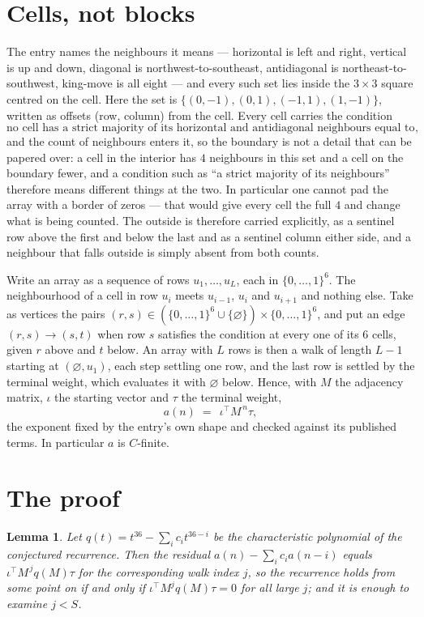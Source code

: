\documentclass[11pt,a4paper]{article}
\theoremstyle{plain}
\newtheorem{lemma}[theorem]{Lemma}
\theoremstyle{definition}
\begin{document}
\section{Cells, not blocks}

The entry names the neighbours it means --- horizontal is left and right, vertical is up and
down, diagonal is northwest-to-southeast, antidiagonal is northeast-to-southwest, king-move is
all eight --- and every such set lies inside the $3\times3$ square centred on the cell. Here
the set is $\{(0,-1), (0,1), (-1,1), (1,-1)\}$, written as offsets (row, column) from the cell. Every cell carries
the condition
\[
\text{no cell has a strict majority of its horizontal and antidiagonal neighbours equal to 1},
\]
and the count of neighbours enters it, so the boundary is not a detail that can be papered
over: a cell in the interior has $4$ neighbours in this set and a cell on the boundary
fewer, and a condition such as ``a strict majority of its neighbours'' therefore means
different things at the two. In particular one cannot pad the array with a border of zeros ---
that would give every cell the full $4$ and change what is being counted. The outside is
therefore carried
explicitly, as a sentinel row above the first and below the last and as a sentinel column
either side, and a neighbour that falls outside is simply absent from both counts.

Write an array as a sequence of rows $u_1,\dots,u_L$, each in
$\{0,\dots,1\}^{6}$. The neighbourhood of a cell in row $u_i$ meets $u_{i-1}$,
$u_i$ and $u_{i+1}$ and nothing else. Take as vertices the pairs
$(r,s)\in(\{0,\dots,1\}^{6}\cup\{\varnothing\})\times\{0,\dots,1\}^{6}$,
and put an edge $(r,s)\to(s,t)$ when row $s$ satisfies the condition at every one of its
$6$ cells, given $r$ above and $t$ below. An array with $L$ rows is then a walk of length
$L-1$ starting at $(\varnothing,u_1)$, each step settling one row, and the last row is
settled by the terminal weight, which evaluates it with $\varnothing$ below. Hence,
with $M$ the adjacency matrix, $\iota$ the starting vector and $\tau$ the terminal weight,
\[
a(n)\;=\;\,\iota^{\!\top}M^{\,n}\tau ,
\]
the exponent fixed by the entry's own shape and checked against its published terms. In
particular $a$ is $C$-finite.

\section{The proof}

\begin{lemma}\label{lem:crit}
Let $q(t)=t^{36}-\sum_i c_it^{36-i}$ be the characteristic polynomial of the
conjectured recurrence. Then the residual $a(n)-\sum_ic_ia(n-i)$ equals
$\iota^{\!\top}M^{\,j}q(M)\tau$ for the corresponding walk index $j$, so the
recurrence holds from some point on if and only if $\iota^{\!\top}M^{j}q(M)\tau=0$ for all
large $j$; and it is enough to examine $j<S$.
\end{lemma}
\end{document}
